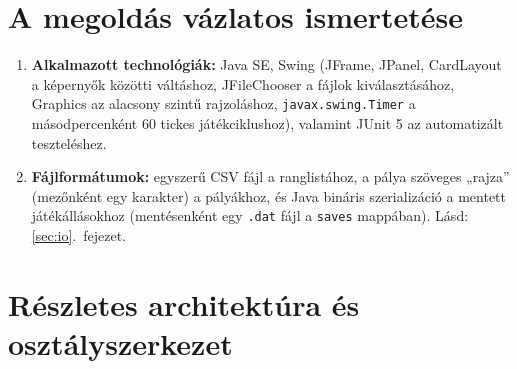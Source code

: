 \documentclass[11pt, a4paper]{article}
\begin{document}
\section{A megoldás vázlatos ismertetése}
\begin{enumerate}
    \item \textbf{Alkalmazott technológiák:} Java SE, Swing (JFrame, JPanel, CardLayout a képernyők közötti váltáshoz, JFileChooser a fájlok kiválasztásához, Graphics az alacsony szintű rajzoláshoz, \texttt{javax.swing.Timer} a másodpercenként 60 tickes játékciklushoz), valamint JUnit 5 az automatizált teszteléshez.
    \item \textbf{Fájlformátumok:} egyszerű CSV fájl a ranglistához, a pálya szöveges „rajza” (mezőnként egy karakter) a pályákhoz, és Java bináris szerializáció a mentett játékállásokhoz (mentésenként egy \texttt{.dat} fájl a \texttt{saves} mappában). Lásd: \ref{sec:io}.~fejezet.
\end{enumerate}

\clearpage

\section{Részletes architektúra és osztályszerkezet}
\end{document}
